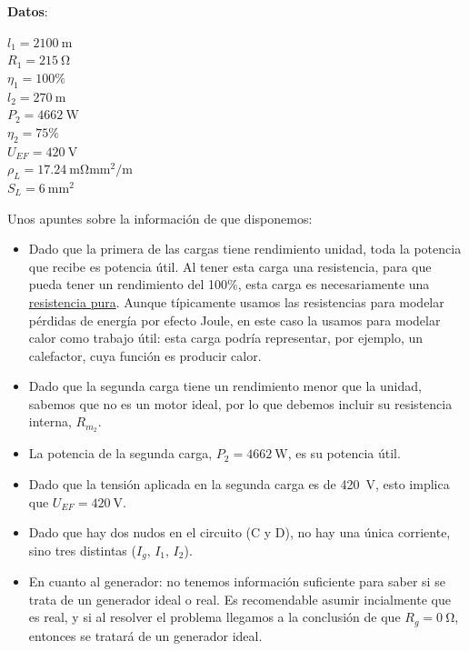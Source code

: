 \begin{example}
\begin{minipage}{0.275\linewidth}
      \vspace{-5mm} \textbf{Datos}:
      
      \vspace{2mm}
    
      $l_1 = \qty{2100}{\meter}$\\
      $R_1 = \qty{215}{\ohm}$\\
      $\eta_1 = 100\%$\\
      $l_2 = \qty{270}{\meter}$\\
      $P_2 = \qty{4662}{\watt}$\\
      $\eta_2 = 75\%$\\
      $U_{EF} = \qty{420}{\volt}$\\
      $\rho_L = \qty{17.24}{\milli\ohm\milli\meter\squared\per\meter}$\\
      $S_L = \qty{6}{\milli\meter\squared}$
    \end{minipage}
    
    \vspace{6mm}
    
    Unos apuntes sobre la información de que disponemos:
    \begin{itemize}
    \item Dado que la primera de las cargas tiene rendimiento unidad,
      toda la potencia que recibe es potencia útil. Al tener esta
      carga una resistencia, para que pueda tener un rendimiento del
      100\%, esta carga es necesariamente una \underline{resistencia
        pura}. Aunque típicamente usamos las resistencias para modelar
      pérdidas de energía por efecto Joule, en este caso la usamos
      para modelar calor como trabajo útil: esta carga podría
      representar, por ejemplo, un calefactor, cuya función es
      producir calor.
    \item Dado que la segunda carga tiene un rendimiento menor que la
      unidad, sabemos que no es un motor ideal, por lo que debemos
      incluir su resistencia interna, $R_{m_2}$.
    \item La potencia de la segunda carga, $P_2 = \qty{4662}{\watt}$,
      es su potencia útil.
    \item Dado que la tensión aplicada en la segunda carga es de
      \qty{420}{\volt}, esto implica que $U_{EF} = \qty{420}{\volt}$.
    \item Dado que hay dos nudos en el circuito (C y D), no hay una
      única corriente, sino tres distintas ($I_g, \, I_1, \, I_2$).
    \item En cuanto al generador: no tenemos información suficiente
      para saber si se trata de un generador ideal o real. Es
      recomendable asumir incialmente que es real, y si al resolver el
      problema llegamos a la conclusión de que $R_g=\qty{0}{\ohm}$,
      entonces se tratará de un generador ideal.
    \end{itemize}
    

\end{example}
